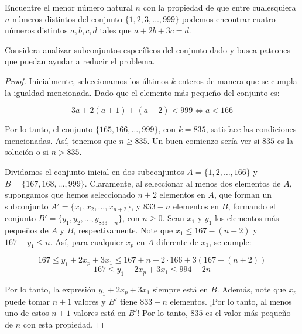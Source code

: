 \documentclass[11pt]{scrartcl}
\begin{document}
\begin{problem}[Ibero 1998] Encuentre el menor número natural $n$ con la propiedad de que entre cualesquiera $n$ números distintos del conjunto $\{1, 2, 3, \dots, 999\}$ podemos encontrar cuatro números distintos $a, b, c, d$ tales que $a + 2b + 3c = d$.
\begin{hint}
Considera analizar subconjuntos específicos del conjunto dado y busca patrones que puedan ayudar a reducir el problema.
\begin{proof}
    Inicialmente, seleccionamos los últimos $k$ enteros de manera que se cumpla la igualdad mencionada. Dado que el elemento más pequeño del conjunto es:

\[ 3a + 2(a + 1) + (a + 2) < 999 \iff a < 166 \]

Por lo tanto, el conjunto $\{165, 166, \dots, 999\}$, con $k = 835$, satisface las condiciones mencionadas. Así, tenemos que $n \geq 835$. Un buen comienzo sería ver si $835$ es la solución o si $n > 835$.

Dividamos el conjunto inicial en dos subconjuntos $A = \{1, 2, \dots, 166\}$ y $B = \{167, 168, \dots, 999\}$. Claramente, al seleccionar al menos dos elementos de $A$, supongamos que hemos seleccionado $n + 2$ elementos en $A$, que forman un subconjunto $A' = \{x_1, x_2, \dots, x_{n+2}\}$, y $833 - n$ elementos en $B$, formando el conjunto $B' = \{y_1, y_2, \dots, y_{833 - n}\}$, con $n \geq 0$. Sean $x_1$ y $y_1$ los elementos más pequeños de $A$ y $B$, respectivamente. Note que $x_1 \leq 167 - (n + 2)$ y $167 + y_1 \leq n$. Así, para cualquier $x_p$ en $A$ diferente de $x_1$, se cumple:

\[ 167 \leq y_1 + 2x_p + 3x_1 \leq 167 + n + 2 \cdot 166 + 3(167 - (n + 2)) \]
\[ 167 \leq y_1 + 2x_p + 3x_1 \leq 994 - 2n \]

Por lo tanto, la expresión $y_1 + 2x_p + 3x_1$ siempre está en $B$. Además, note que $x_p$ puede tomar $n + 1$ valores y $B'$ tiene $833 - n$ elementos. ¡Por lo tanto, al menos uno de estos $n + 1$ valores está en $B'$! Por lo tanto, $835$ es el valor más pequeño de $n$ con esta propiedad.
\end{proof}
\end{hint}

\end{problem}
\end{document}
